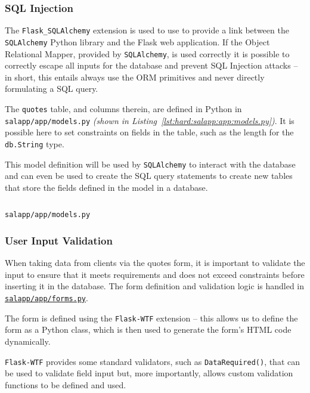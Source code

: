 \subsubsection{SQL Injection}
The \texttt{Flask\_SQLAlchemy} extension is used to use to provide a link between the \texttt{SQLAlchemy} Python library and the Flask web application. If the Object Relational Mapper, provided by \texttt{SQLAlchemy}, is used correctly it is possible to correctly escape all inputs for the database and prevent SQL Injection attacks -- in short, this entails always use the ORM primitives and never directly formulating a SQL query.

The \texttt{quotes} table, and columns therein, are defined in Python in \texttt{salapp/app/models.py} \textit{(shown in Listing~\ref{lst:hard:salapp:app:models.py})}. It is possible here to set constraints on fields in the table, such as the length for the \texttt{db.String} type.

This model definition will be used by \texttt{SQLAlchemy} to interact with the database and can even be used to create the SQL query statements to create new tables that store the fields defined in the model in a database.
\begin{listing}[H]
  \captionsetup{skip=\skiplistingcaptionlen}
  \inputminted[breakanywhere,firstline=5]{python3}{../uswacs-2-iy2d502-salapp/app/models.py}
  \caption{\texttt{salapp/app/models.py}}
  \label{lst:hard:salapp:app:models.py}
\end{listing}

\subsubsection{User Input Validation}
When taking data from clients via the quotes form, it is important to validate the input to ensure that it meets requirements and does not exceed constraints before inserting it in the database. The form definition and validation logic is handled in \hyperref[fcl:uswacs-2-iy2d502-salapp:forms.py]{\texttt{salapp/app/forms.py}}.

The form is defined using the \texttt{Flask-WTF} extension -- this allows us to define the form as a Python class, which is then used to generate the form's HTML code dynamically.

\texttt{Flask-WTF} provides some standard validators, such as \texttt{DataRequired()}, that can be used to validate field input but, more importantly, allows custom validation functions to be defined and used.

